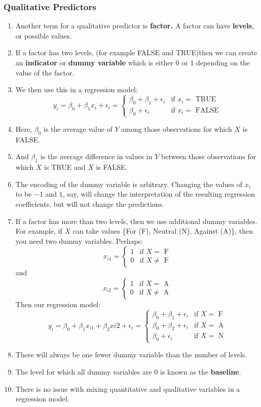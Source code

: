 \documentclass[10pt]{article}
\newcommand{\eps}{\epsilon}
\begin{document}
\subsubsection{Qualitative Predictors} 
\begin{enumerate}
	\item Another term for a qualitative predictor is \textbf{factor.} A factor can have \textbf{levels}, or possible values.  
	\item If a factor has two levels, (for example FALSE and TRUE)then we can create an \textbf{indicator} or \textbf{dummy variable} which is either 0 or 1 depending on the value of the factor.  
	\item We then use this in a regression model:
	$$y_i = \beta_0 + \beta_1 x_i + \eps_i = \begin{cases} \beta_0 + \beta_1 + \eps_i & \text{if $x_i =$ TRUE} \\
	\beta_0 + \eps_i & \text{if $x_i =$ FALSE} \end{cases}$$
	\item Here, $\beta_0$ is the average value of $Y$ among those observations for which $X$ is FALSE.  \item And $\beta_1$ is the average difference in values in $Y$ between those observations for which $X$ is TRUE and $X$ is FALSE.
	\item The encoding of the dummy variable is arbitrary.  Changing the values of $x_i$ to be $-1$ and $1$, say, will change the interpretation of the resulting regression coefficients, but will not change the predictions.
	\item If a factor has more than two levels, then we use additional dummy variables.  For example, if $X$ can take values \{For (F), Neutral (N), Against (A)\}, then you need two dummy variables.  Perhaps:
	$$x_{i1} = \begin{cases} 1 & \text{if $X =$ F} \\
	0 & \text{if $X \neq$ F} \end{cases}  $$
	and 
	$$x_{i2} = \begin{cases} 1 & \text{if $X =$ A} \\
	0 & \text{if $X \neq$ A} \end{cases}  $$
	Then our regression model:
	$$y_i = \beta_0 + \beta_1x_{i1} + \beta_2x{i2} + \eps_i = \begin{cases} \beta_0 + \beta_1 + \eps_i & \text{if $X =$ F} \\
	\beta_0 + \beta_2 + \eps_i & \text{if $X =$ A} \\
	\beta_0 + \eps_i & \text{if $X =$ N} \end{cases} $$
	\item There will always be one fewer dummy variable than the number of levels.
	\item The level for which all dummy variables are 0 is known as the \textbf{baseline}. 
	\item There is no issue with mixing quantitative and qualitative variables in a regression model.
\end{enumerate}
\end{document}
